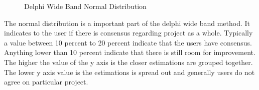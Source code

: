 \begin{itemize}
\begin{figure}[H]
	    	\caption{Delphi Wide Band Normal Distribution}
	    	\label{fig:Delphi Wide Band Normal Distribution}
   	\end{figure}
	The normal distribution is a important part of the delphi wide band method. It indicates to the user if there is consensus regarding project as a whole. Typically a value between 10 percent to 20 percent indicate that the users have consensus. Anything lower than 10 percent indicate that there is still room for improvement. The higher the value of the y axis is the closer estimations are grouped together. The lower y axis value is the estimations is spread out and generally users do not agree on particular project.
\end{itemize}
